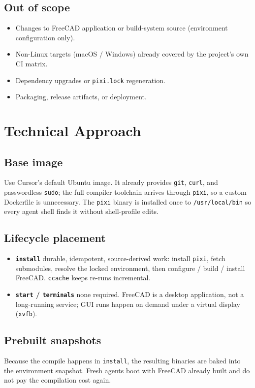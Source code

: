 \documentclass[11pt]{article}
\begin{document}
\subsection{Out of scope}
\begin{itemize}
  \item Changes to FreeCAD application or build-system source (environment configuration only).
  \item Non-Linux targets (macOS / Windows) \textemdash{} already covered by the project's own CI matrix.
  \item Dependency upgrades or \texttt{pixi.lock} regeneration.
  \item Packaging, release artifacts, or deployment.
\end{itemize}

\section{Technical Approach}

\subsection{Base image}
Use Cursor's default Ubuntu image. It already provides \texttt{git}, \texttt{curl}, and
passwordless \texttt{sudo}; the full compiler toolchain arrives through \texttt{pixi}, so a
custom Dockerfile is unnecessary. The \texttt{pixi} binary is installed once to
\texttt{/usr/local/bin} so every agent shell finds it without shell-profile edits.

\subsection{Lifecycle placement}
\begin{itemize}
  \item \textbf{\texttt{install}} \textemdash{} durable, idempotent, source-derived work: install \texttt{pixi}, fetch submodules, resolve the locked environment, then configure / build / install FreeCAD. \texttt{ccache} keeps re-runs incremental.
  \item \textbf{\texttt{start} / \texttt{terminals}} \textemdash{} none required. FreeCAD is a desktop application, not a long-running service; GUI runs happen on demand under a virtual display (\texttt{xvfb}).
\end{itemize}

\subsection{Prebuilt snapshots}
Because the compile happens in \texttt{install}, the resulting binaries are baked into the
environment snapshot. Fresh agents boot with FreeCAD already built and do not pay the
compilation cost again.
\end{document}
